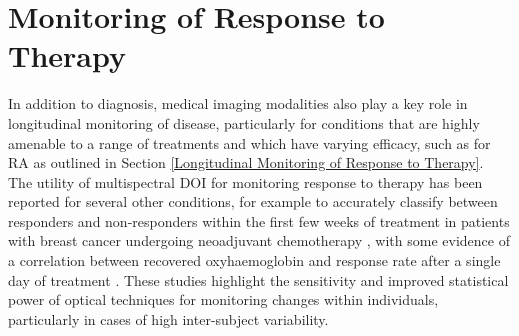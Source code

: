 \documentclass[twoside]{bhamthesis}
\theoremstyle{definition}
\begin{document}
%




\section{Monitoring of Response to Therapy}
\label{Monitoring of Response to Therapy}

In addition to diagnosis, medical imaging modalities also play a key role in longitudinal monitoring of disease, particularly for conditions that are highly amenable to a range of treatments and which have varying efficacy, such as for RA as outlined in Section \ref{Longitudinal Monitoring of Response to Therapy}. The utility of multispectral DOI for monitoring response to therapy has been reported for several other conditions, for example to accurately classify between responders and non-responders within the first few weeks of treatment in patients with breast cancer undergoing neoadjuvant chemotherapy  \cite{soliman2010functional,cerussi2007predicting,cochran2018tissue}, with some evidence of a correlation between recovered oxyhaemoglobin and response rate after a single day of treatment \cite{roblyer2011optical}. These studies highlight the sensitivity and improved statistical power of optical techniques for monitoring changes within individuals, particularly in cases of high inter-subject variability.
\end{document}
